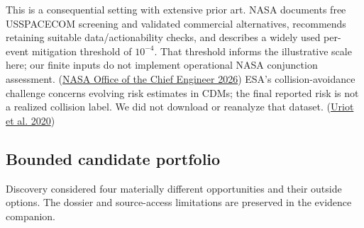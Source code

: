 \documentclass[11pt,letterpaper]{article}
\begin{document}
This is a consequential setting with extensive prior art. NASA documents
free USSPACECOM screening and validated commercial alternatives,
recommends retaining suitable data/actionability checks, and describes a
widely used per-event mitigation threshold of \(10^{-4}\). That
threshold informs the illustrative scale here; our finite inputs do not
implement operational NASA conjunction assessment.
(\protect\hyperlink{ref-nasa2026}{NASA Office of the Chief Engineer
2026}) ESA's collision-avoidance challenge concerns evolving risk
estimates in CDMs; the final reported risk is not a realized collision
label. We did not download or reanalyze that dataset.
(\protect\hyperlink{ref-uriot2020}{Uriot et al. 2020})

\hypertarget{bounded-candidate-portfolio}{%
\subsection{Bounded candidate
portfolio}\label{bounded-candidate-portfolio}}

Discovery considered four materially different opportunities and their
outside options. The dossier and source-access limitations are preserved
in the evidence companion.
\end{document}
